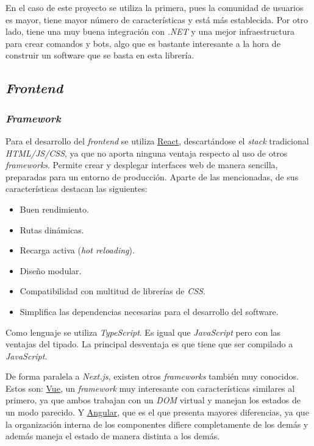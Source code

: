En el caso de este proyecto se utiliza la primera, pues la comunidad de usuarios es mayor, tiene mayor número de características y está más establecida. Por otro lado, tiene una muy buena integración con \textit{.NET} y una mejor infraestructura para crear comandos y bots, algo que es bastante interesante a la hora de construir un software que se basta en esta librería.


\subsection{\textit{Frontend}} 

\subsubsection{\textit{Framework}}

Para el desarrollo del \textit{frontend} se utiliza \href{https://es.reactjs.org/}{React}, descartándose el \textit{stack} tradicional \textit{HTML/JS/CSS}, ya que no aporta ninguna ventaja respecto al uso de otros \textit{frameworks}. Permite crear y desplegar interfaces web de manera sencilla, preparadas para un entorno de producción. Aparte de las mencionadas, de sus características destacan las siguientes:

\begin{itemize}
	\item Buen rendimiento.
	\item Rutas dinámicas.
	\item Recarga activa (\textit{hot reloading}).
	\item Diseño modular.
	\item Compatibilidad con multitud de librerías de \textit{CSS}.
	\item Simplifica las dependencias necesarias para el desarrollo del software.
\end{itemize}

Como lenguaje se utiliza \textit{TypeScript}. Es igual que \textit{JavaScript} pero con las ventajas del tipado. La principal desventaja es que tiene que ser compilado a \textit{JavaScript}.

De forma paralela a \textit{Next.js}, existen otros \textit{frameworks} también muy conocidos. Estos son: \href{https://vuejs.org/}{Vue}, un \textit{framework} muy interesante con características similares al primero, ya que ambos trabajan con un \textit{DOM} virtual y manejan los estados de un modo parecido. Y \href{https://angular.io/}{Angular}, que es el que presenta mayores diferencias, ya que la organización interna de los componentes difiere completamente de los demás y además maneja el estado de manera distinta a los demás.


